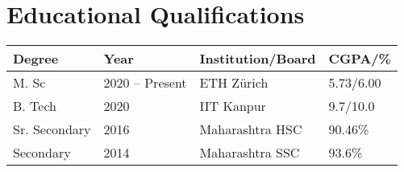 \section*{Educational Qualifications}
\begin{tabulary}{\textwidth}{L L L L}

\toprule
\textbf{Degree} & \textbf{Year} & \textbf{Institution/Board} & \textbf{CGPA/\%}\\
\midrule
M. Sc & 2020 -- Present & ETH Zürich & 5.73/6.00\\%
B. Tech & 2020 & IIT Kanpur & 9.7/10.0\\
Sr. Secondary & 2016 & Maharashtra HSC & 90.46\%\\
Secondary & 2014 & Maharashtra SSC & 93.6\%\\
\bottomrule

\end{tabulary}
